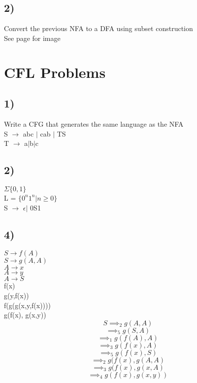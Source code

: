 \documentclass[12pt]{article}
\begin{document}
	\subsection*{2)}
	Convert the previous NFA to a DFA using subset construction\\
	
	See page for image
	
	\section*{CFL Problems}
	
	\subsection*{1)}
	Write a CFG that generates the same language as the NFA\\
	
	S $\rightarrow$ abc $|$ cab $|$ TS\\
	T $\rightarrow$ a$|$b$|$c\\
	
	\subsection*{2)}
	$\Sigma \{0,1\}$\\
	L = $\{0^n1^n | n \geq 0 \}$\\
	
	S $\rightarrow$ $\epsilon | $ 0S1\\
	
	\subsection*{4)}
	$S \rightarrow f(A)$\\
	$S \rightarrow g(A,A)$\\
	$A \rightarrow x$\\
	$A \rightarrow y$\\
	$A \rightarrow S$\\
	f(x)\\
	g(y,f(x))\\
	f(g(g(x,y,f(x))))\\
	
	g(f(x), g(x,y))\\
	
	$$S \implies_2 g(A,A)$$
	$$\implies_5 g(S,A)$$
	$$\implies_1 g(f(A), A)$$
	$$\implies_3 g(f(x), A)$$
	$$\implies_5 g(f(x), S)$$
	$$\implies_2 g(f(x), g(A,A)$$
	$$\implies_3 g(f(x), g(x, A)$$
	$$\implies_4 g(f(x), g(x,y))$$
	
\end{document}
